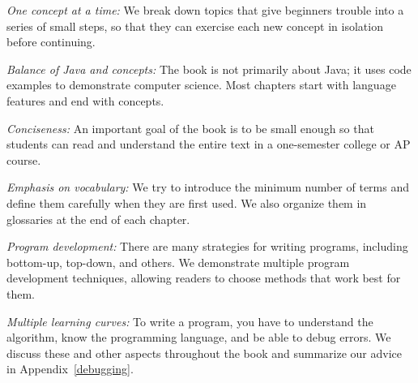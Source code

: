 \begin{description}

\item {\em One concept at a time:}
We break down topics that give beginners trouble into a series of small steps, so that they can exercise each new concept in isolation before continuing.

\item {\em Balance of Java and concepts:}
The book is not primarily about Java; it uses code examples to demonstrate computer science.
Most chapters start with language features and end with concepts.

\item {\em Conciseness:}
An important goal of the book is to be small enough so that students can read and understand the entire text in a one-semester college or AP course.

\item {\em Emphasis on vocabulary:}
We try to introduce the minimum number of terms and define them carefully when they are first used.
We also organize them in glossaries at the end of each chapter.

\item {\em Program development:}
There are many strategies for writing programs, including bottom-up, top-down, and others.
We demonstrate multiple program development techniques, allowing readers to choose methods that work best for them.

\item {\em Multiple learning curves:}
To write a program, you have to understand the algorithm, know the programming language, and be able to debug errors.
We discuss these and other aspects throughout the book and summarize our advice in Appendix~\ref{debugging}.



\end{description}


